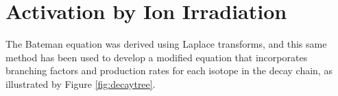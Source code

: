 



\section{Activation by Ion Irradiation}







The Bateman equation was derived using Laplace transforms, and this same method has been used to develop a modified equation that incorporates branching factors and production rates for each isotope in the decay chain, as illustrated by Figure \ref{fig:decaytree}.

